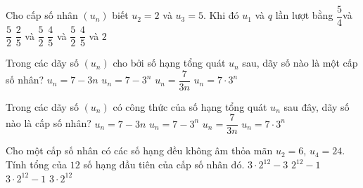\begin{ex}%
	Cho cấp số nhân $(u_n)$ biết $u_2=2$ và $u_3=5$. Khi đó $u_1$  và $q$ lần lượt bằng
	 \choice
		 {$\dfrac{5}{4}$và $\dfrac{5}{2}$}
		{$\dfrac{2}{5}$ và $\dfrac{5}{2}$} 
		 {\True $\dfrac{4}{5}$ và $\dfrac{5}{2}$}
		 {$\dfrac{4}{5}$ và $2$}
\end{ex}

\begin{ex}%
	Trong các dãy số $(u_n)$ cho bởi số hạng tổng  quát $u_n$ sau, dãy số nào là một cấp số nhân?
	 \choice
		{$u_n=7-3n$} 
		{$u_n=7-3^n$} 
		{$u_n=\dfrac{7}{3n}$} 
		{\True $u_n=7\cdot 3^n$} 
\end{ex}

\begin{ex}%
	Trong các dãy số $(u_n)$  có công thức của số hạng tổng quát $u_n$ sau đây, dãy số nào là cấp số nhân?
	\choice 
		 {$u_n=7-3n$}
		 {$u_n=7-3^n$}
		{$u_n=\dfrac{7}{3n}$} 
		{\True  $u_n=7\cdot 3^n$}
\end{ex}

\begin{ex}%
	Cho một cấp số nhân có các số hạng đều không âm thỏa mãn $u_2=6$, $u_4=24$. Tính tổng của $12$ số hạng đầu  tiên của cấp số nhân đó.
	 \choice
		{\True $3\cdot  2^{12}-3$}
		 {$2^{12}-1$}
		{$3\cdot  2^{12}-1$}
		{$3\cdot  2^{12}$}
\end{ex}

